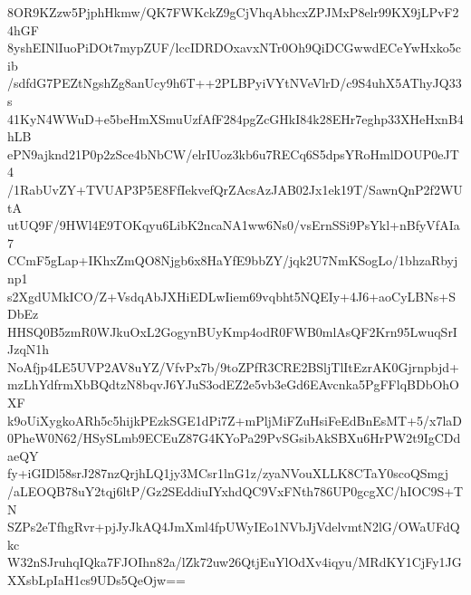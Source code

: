 8OR9KZzw5PjphHkmw/QK7FWKckZ9gCjVhqAbhcxZPJMxP8elr99KX9jLPvF24hGF
8yshEINlIuoPiDOt7mypZUF/lccIDRDOxavxNTr0Oh9QiDCGwwdECeYwHxko5cib
/sdfdG7PEZtNgshZg8anUcy9h6T++2PLBPyiVYtNVeVlrD/c9S4uhX5AThyJQ33s
41KyN4WWuD+e5beHmXSmuUzfAfF284pgZcGHkI84k28EHr7eghp33XHeHxnB4hLB
ePN9ajknd21P0p2zSce4bNbCW/elrIUoz3kb6u7RECq6S5dpsYRoHmlDOUP0eJT4
/1RabUvZY+TVUAP3P5E8FfIekvefQrZAcsAzJAB02Jx1ek19T/SawnQnP2f2WUtA
utUQ9F/9HWl4E9TOKqyu6LibK2ncaNA1ww6Ns0/vsErnSSi9PsYkl+nBfyVfAIa7
CCmF5gLap+IKhxZmQO8Njgb6x8HaYfE9bbZY/jqk2U7NmKSogLo/1bhzaRbyjnp1
s2XgdUMkICO/Z+VsdqAbJXHiEDLwIiem69vqbht5NQEIy+4J6+aoCyLBNs+SDbEz
HHSQ0B5zmR0WJkuOxL2GogynBUyKmp4odR0FWB0mlAsQF2Krn95LwuqSrIJzqN1h
NoAfjp4LE5UVP2AV8uYZ/VfvPx7b/9toZPfR3CRE2BSljTlItEzrAK0Gjrnpbjd+
mzLhYdfrmXbBQdtzN8bqvJ6YJuS3odEZ2e5vb3eGd6EAvcnka5PgFFlqBDbOhOXF
k9oUiXygkoARh5c5hijkPEzkSGE1dPi7Z+mPljMiFZuHsiFeEdBnEsMT+5/x7laD
0PheW0N62/HSySLmb9ECEuZ87G4KYoPa29PvSGsibAkSBXu6HrPW2t9IgCDdaeQY
fy+iGIDl58srJ287nzQrjhLQ1jy3MCsr1lnG1z/zyaNVouXLLK8CTaY0scoQSmgj
/aLEOQB78uY2tqj6ltP/Gz2SEddiuIYxhdQC9VxFNth786UP0gcgXC/hIOC9S+TN
SZPs2eTfhgRvr+pjJyJkAQ4JmXml4fpUWyIEo1NVbJjVdelvmtN2lG/OWaUFdQkc
W32nSJruhqIQka7FJOIhn82a/lZk72uw26QtjEuYlOdXv4iqyu/MRdKY1CjFy1JG
XXsbLpIaH1cs9UDs5QeOjw==
